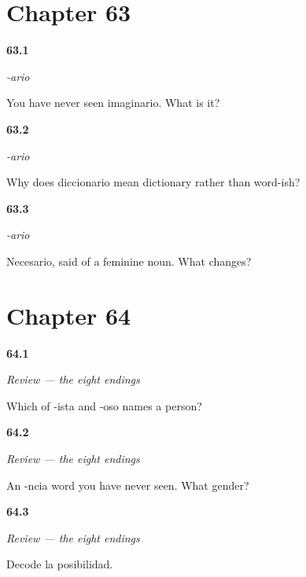 \section*{Chapter 63}

\noindent\begin{minipage}[t]{\linewidth}
\raggedright
\hypertarget{review-ES-C09-ario-decode}{\textbf{63.1}} \emph{-ario}\par
\small You have never seen imaginario. What is it?
\end{minipage}\par\medskip

\noindent\begin{minipage}[t]{\linewidth}
\raggedright
\hypertarget{review-ES-C09-ario-place}{\textbf{63.2}} \emph{-ario}\par
\small Why does diccionario mean dictionary rather than word-ish?
\end{minipage}\par\medskip

\noindent\begin{minipage}[t]{\linewidth}
\raggedright
\hypertarget{review-ES-C09-ario-shift}{\textbf{63.3}} \emph{-ario}\par
\small Necesario, said of a feminine noun. What changes?
\end{minipage}\par\medskip

\section*{Chapter 64}

\noindent\begin{minipage}[t]{\linewidth}
\raggedright
\hypertarget{review-ES-C09-repaso-ocho-sort}{\textbf{64.1}} \emph{Review — the eight endings}\par
\small Which of -ista and -oso names a person?
\end{minipage}\par\medskip

\noindent\begin{minipage}[t]{\linewidth}
\raggedright
\hypertarget{review-ES-C09-repaso-ocho-gender}{\textbf{64.2}} \emph{Review — the eight endings}\par
\small An -ncia word you have never seen. What gender?
\end{minipage}\par\medskip

\noindent\begin{minipage}[t]{\linewidth}
\raggedright
\hypertarget{review-ES-C09-repaso-ocho-reach}{\textbf{64.3}} \emph{Review — the eight endings}\par
\small Decode la posibilidad.
\end{minipage}\par\medskip

